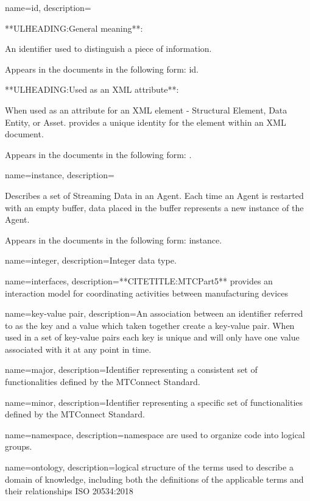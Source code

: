 {
    name={id},
	description={
	**ULHEADING:General meaning**:

	An identifier used to distinguish a piece of information.

	Appears in the documents in the following form: id.

	**ULHEADING:Used as an XML attribute**:

	When used as an attribute for an XML element - \gls{Structural Element}, \gls{Data Entity}, or \gls{Asset}.   provides a unique identity for the element within an XML document.

	Appears in the documents in the following form: .
}
}

{
    name={instance},
	description={
	Describes a set of \gls{Streaming Data} in an \gls{Agent}.  Each time an \gls{Agent} is restarted with an empty \gls{buffer}, data placed in the \gls{buffer} represents a new \gls{instance} of the \gls{Agent}.

	Appears in the documents in the following form: \gls{instance}.
}
}

{
    name={integer},
	description={Integer data type.}
}

{
    name={interfaces},
	description={**CITETITLE:MTCPart5** provides an interaction model for coordinating activities between manufacturing devices}
}

{
    name={key-value pair},
	description={An association between an identifier referred to as the \gls{key} and a value which taken together create a \gls{key-value pair}. When used in a set of \gls{key-value pairs} each \gls{key} is unique and will only have one value associated with it at any point in time.}
}

{
    name={major},
	description={Identifier representing a consistent set of functionalities defined by the MTConnect Standard.}
}

{
    name={minor},
	description={Identifier representing a specific set of functionalities defined by the MTConnect Standard.}
}

{
    name={namespace},
	description={\gls{namespace} are used to organize code into logical groups.}
}

{
    name={ontology},
	description={logical structure of the terms used to describe a domain of knowledge, including both the definitions of the applicable terms and their relationships ISO 20534:2018}
}

